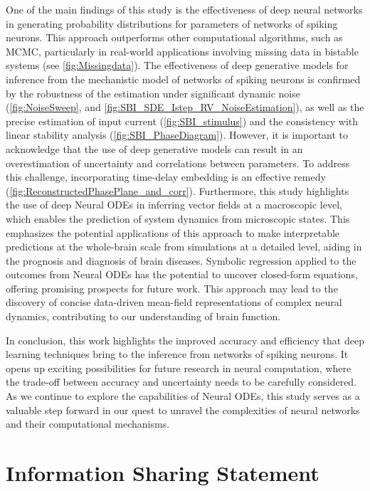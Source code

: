 \documentclass[preprint,11pt,authoryear]{elsarticle}
\begin{document}
One of the main findings of this study is the effectiveness of deep neural networks in generating probability distributions for parameters of networks of spiking neurons. This approach outperforms other computational algorithms, such as MCMC, particularly in real-world applications involving missing data in bistable systems (see \autoref{fig:Missingdata}). The effectiveness of deep generative models for inference from the mechanistic model of networks of spiking neurons is confirmed by the robustness of the estimation under significant dynamic noise (\autoref{fig:NoiseSweep}, and \autoref{fig:SBI_SDE_Istep_RV_NoiseEstimation}), as well as the precise estimation of input current (\autoref{fig:SBI_stimulus}) and the consistency with linear stability analysis (\autoref{fig:SBI_PhaseDiagram}). However, it is important to acknowledge that the use of deep generative models can result in an overestimation of uncertainty and correlations between parameters. To address this challenge, incorporating time-delay embedding is an effective remedy (\autoref{fig:ReconstructedPhasePlane_and_corr}). Furthermore, this study highlights the use of deep Neural ODEs in inferring vector fields at a macroscopic level, which enables the prediction of system dynamics from microscopic states. This emphasizes the potential applications of this approach to make interpretable predictions at the whole-brain scale from simulations at a detailed level, aiding in the prognosis and diagnosis of brain diseases. Symbolic regression applied to the outcomes from Neural ODEs has the potential to uncover closed-form equations, offering promising prospects for future work. This approach may lead to the discovery of concise data-driven mean-field representations of complex neural dynamics, contributing to our understanding of brain function.


In conclusion, this work highlights the improved accuracy and efficiency that deep learning techniques bring to the inference from networks of spiking neurons. It opens up exciting possibilities for future research in neural computation, where the trade-off between accuracy and uncertainty needs to be carefully considered. As we continue to explore the capabilities of Neural ODEs, this study serves as a valuable step forward in our quest to unravel the complexities of neural networks and their computational mechanisms.




\section*{Information Sharing Statement}
\end{document}
